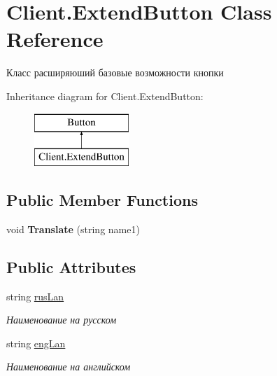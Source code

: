 \hypertarget{class_client_1_1_extend_button}{}\section{Client.\+Extend\+Button Class Reference}
\label{class_client_1_1_extend_button}


Класс расширяюший базовые возможности кнопки  


Inheritance diagram for Client.\+Extend\+Button\+:\begin{figure}[H]
\begin{center}
\leavevmode
\includegraphics[height=2.000000cm]{class_client_1_1_extend_button}
\end{center}
\end{figure}
\subsection*{Public Member Functions}
\begin{DoxyCompactItemize}
\item 
\hypertarget{class_client_1_1_extend_button_aab2bbc128bf0463f40c1572372711ed4}{}\label{class_client_1_1_extend_button_aab2bbc128bf0463f40c1572372711ed4} 
void {\bfseries Translate} (string name1)
\end{DoxyCompactItemize}
\subsection*{Public Attributes}
\begin{DoxyCompactItemize}
\item 
string \hyperlink{class_client_1_1_extend_button_a980571f04f44336a1fb9f662a79f760f}{rus\+Lan}
\begin{DoxyCompactList}\small\item\em Наименование на русском \end{DoxyCompactList}\item 
string \hyperlink{class_client_1_1_extend_button_aaa4299e5b2843a9fddaced18352c44a4}{eng\+Lan}
\begin{DoxyCompactList}\small\item\em Наименование на английском \end{DoxyCompactList}\end{DoxyCompactItemize}


